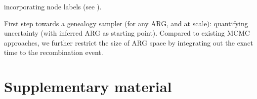 \documentclass{article}
\begin{document}
incorporating node labels (see \citep{guo_recombination-aware_2022}).


First step towards a genealogy sampler (for any ARG, and at scale): 
quantifying uncertainty 
(with inferred ARG as starting point). Compared to existing MCMC approaches, 
we further restrict the size of ARG space by 
integrating out the exact time to the recombination event.






\section{Supplementary material}
\end{document}
